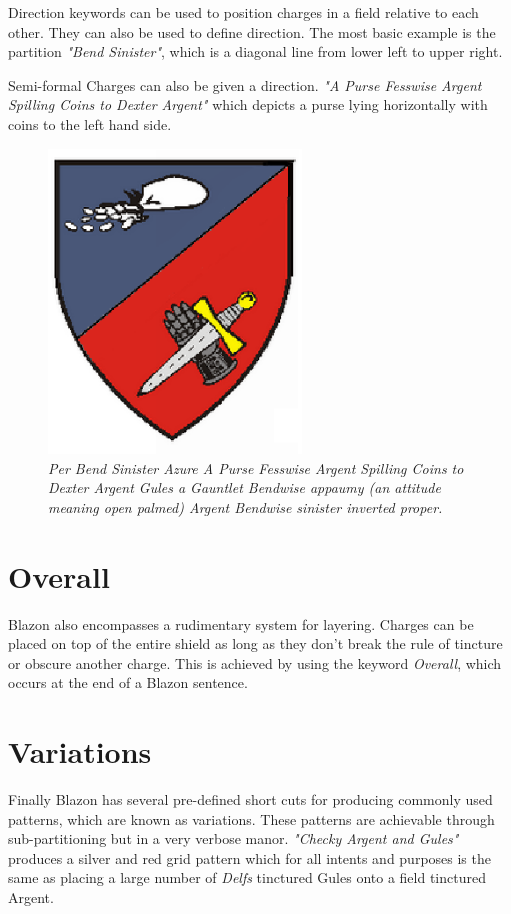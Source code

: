 Direction keywords can be used to position charges in a field relative to each other.  They can also be used to define direction. The most basic example is the partition \emph{"Bend Sinister"}, which is a diagonal line from lower left to upper right.

Semi-formal Charges can also be given a direction.  \emph{"A Purse Fesswise Argent Spilling Coins to Dexter Argent"} which depicts a purse lying horizontally with coins to the left hand side.  

\begin{figure}[H]
  \centering
    \includegraphics[width=0.6\textwidth]{Blazon/images/purse.eps}
  \caption{\emph{Per Bend Sinister Azure A Purse Fesswise Argent Spilling Coins to Dexter Argent Gules a Gauntlet Bendwise appaumy (an attitude meaning open palmed) Argent Bendwise sinister inverted proper.}\cite{fessways}}
  
\end{figure}



\section{Overall}
Blazon also encompasses a rudimentary system for layering. Charges can be placed on top of the entire shield as long as they don't break the rule of tincture or obscure another charge.  This is achieved by using the keyword \emph{Overall}, which occurs at the end of a Blazon sentence.  


\section{Variations}
Finally Blazon has several pre-defined short cuts for producing commonly used patterns, which are known as variations. These patterns are achievable through sub-partitioning but in a very verbose manor.  \emph{"Checky Argent and Gules"} produces a silver and red grid pattern which for all intents and purposes is the same as placing a large number of \emph{Delfs} tinctured Gules onto a field tinctured Argent. 

